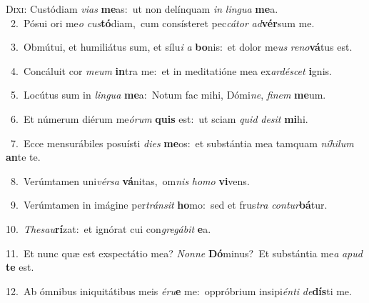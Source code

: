 \lettrine{\initial\textcolor{\initialcolor}{D}}{ixi:} Custódiam \textit{vi}\-\textit{as} \textbf{me}\-as:~\star ut non delínquam \textit{in} \textit{lin}\-\textit{gua} \textbf{me}\-a.\\
{\numbfont\textcolor{\numbcolor}{~2.}}~Pósui ori me\textit{o} \textit{cus}\-\textbf{tó}diam,~\star cum consísteret pec\-\textit{cá}\-\textit{tor} \textit{ad}\-\textbf{vér}sum me.\par
{\numbfont\textcolor{\numbcolor}{~3.}}~Obmútui, et humiliátus sum, et sílu\textit{i} \textit{a} \textbf{bo}\-nis:~\star et dolor me\textit{us} \textit{re}\-\textit{no}\textbf{vá}tus est.\par
{\numbfont\textcolor{\numbcolor}{~4.}}~Concáluit cor \textit{me}\-\textit{um} \textbf{in}\-tra me:~\star et in meditatióne mea ex\-\textit{ar}\-\textit{dé}\textit{scet} \textbf{i}\-gnis.\par
{\numbfont\textcolor{\numbcolor}{~5.}}~Locútus sum in \textit{lin}\-\textit{gua} \textbf{me}\-a:~\star Notum fac mihi, Dómi\-\textit{ne}\-, \textit{fi}\-\textit{nem} \textbf{me}\-um.\par
{\numbfont\textcolor{\numbcolor}{~6.}}~Et númerum diérum me\-\textit{ó}\-\textit{rum} \textbf{quis} est:~\star ut sciam \textit{quid} \textit{de}\-\textit{sit} \textbf{mi}\-hi.\par
{\numbfont\textcolor{\numbcolor}{~7.}}~Ecce mensurábiles posuísti \textit{di}\-\textit{es} \textbf{me}\-os:~\star et substántia mea tamquam \textit{ní}\-\textit{hi}\textit{lum} \textbf{an}\-te te.\par
{\numbfont\textcolor{\numbcolor}{~8.}}~Verúmtamen uni\-\textit{vér}\-\textit{sa} \textbf{vá}\-nitas,~\star om\textit{nis} \textit{ho}\-\textit{mo} \textbf{vi}\-vens.\par
{\numbfont\textcolor{\numbcolor}{~9.}}~Verúmtamen in imágine per\-\textit{tráns}\-\textit{it} \textbf{ho}\-mo:~\star sed et frus\textit{tra} \textit{con}\-\textit{tur}\textbf{bá}tur.\par
{\numbfont\textcolor{\numbcolor}{10.}}~\-\textit{The}\-\textit{sau}\textbf{rí}zat:~\star et ignórat cui con\-\textit{gre}\-\textit{gá}\textit{bit} \textbf{e}\-a.\par
{\numbfont\textcolor{\numbcolor}{11.}}~Et nunc quæ est exspectátio mea? \textit{Non}\-\textit{ne} \textbf{Dó}\-minus?~\star Et substántia me\textit{a} \textit{a}\-\textit{pud} \textbf{te} est.\par
{\numbfont\textcolor{\numbcolor}{12.}}~Ab ómnibus iniquitátibus meis \textit{é}\-\textit{ru}\textbf{e} me:~\star oppróbrium insipi\-\textit{én}\-\textit{ti} \textit{de}\-\textbf{dís}ti me.\par
